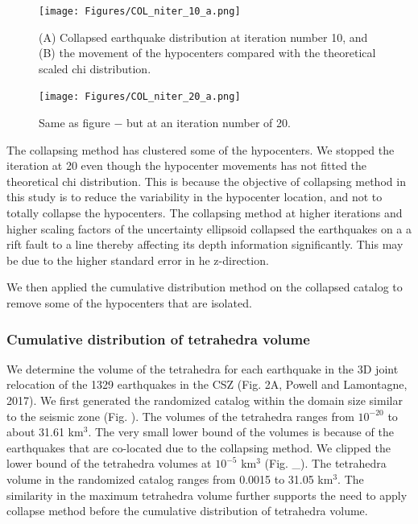 \documentclass[draft]{agujournal2018}
\begin{document}
\begin{figure}[ht]
\centering
\texttt{[image: Figures/COL\_niter\_10\_a.png]}
\caption{(A) Collapsed earthquake distribution at iteration number 10, and (B) the movement of the hypocenters compared with the theoretical scaled chi distribution.}
\label{figfour}
\end{figure} 


\begin{figure}[ht]
\centering
\texttt{[image: Figures/COL\_niter\_20\_a.png]}
\caption{Same as figure $-$ but at an iteration number of 20.}
\label{figfour}
\end{figure} 


The collapsing method has clustered some of the hypocenters. We stopped the iteration at 20 even though the hypocenter movements has not fitted the theoretical chi distribution. This is because the objective of collapsing method in this study is to reduce the variability in the hypocenter location, and not to totally collapse the hypocenters. The collapsing method at higher iterations and higher scaling factors of the uncertainty ellipsoid collapsed the earthquakes on a a rift fault to a line thereby affecting its depth information significantly. This may be due to the higher standard error in he z-direction.%

We then applied the cumulative distribution method on the collapsed catalog to remove some of the hypocenters that are isolated. %






\subsubsection{Cumulative distribution of tetrahedra volume}
We determine the volume of the tetrahedra for each earthquake in the 3D joint relocation of the 1329 earthquakes in the CSZ (Fig. 2A, Powell and Lamontagne, 2017). We first generated the randomized catalog within the domain size similar to the seismic zone (Fig. ). The volumes of the tetrahedra ranges from $10^{-20}$ to about 31.61 km$^{3}$. The very small lower bound of the volumes is because of the earthquakes that are co-located due to the collapsing method. We clipped the lower bound of the tetrahedra volumes at $10^{-5}$ km$^{3}$ (Fig. \_). The tetrahedra volume in the randomized catalog ranges from 0.0015 to 31.05 km$^{3}$. The similarity in the maximum tetrahedra volume further supports the need to apply collapse method before the cumulative distribution of tetrahedra volume.
\end{document}
